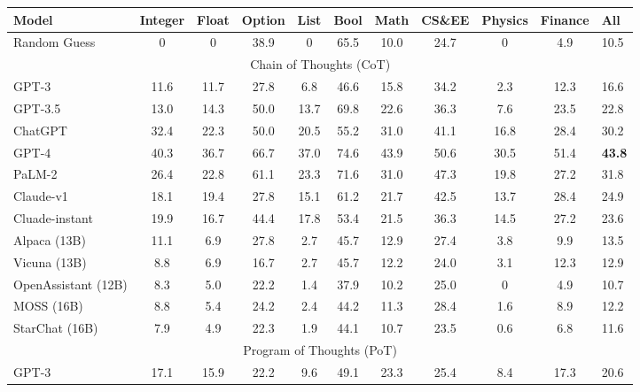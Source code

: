 \documentclass[11pt]{article}
\begin{document}
\begin{table*}[!t]
\centering
\small
\begin{tabular}{l|ccccc|cccc|l}
\toprule
Model               & Integer & Float & Option & List & Bool & Math & CS\&EE & Physics & Finance & All    \\
\midrule
Random Guess        & 0       &  0    & 38.9   & 0    & 65.5 & 10.0 & 24.7   & 0       &  4.9    & 10.5          \\
\midrule
\multicolumn{11}{c}{Chain of Thoughts (CoT)} \\
\midrule
GPT-3               & 11.6    & 11.7  & 27.8   & 6.8  & 46.6 & 15.8 & 34.2   & 2.3     &  12.3   & 16.6          \\
GPT-3.5             & 13.0    & 14.3  & 50.0   & 13.7 & 69.8 & 22.6 & 36.3   & 7.6     &  23.5   & 22.8          \\
ChatGPT             & 32.4    & 22.3  & 50.0   & 20.5 & 55.2 & 31.0 & 41.1   & 16.8    &  28.4   & 30.2          \\
GPT-4               & 40.3    & 36.7  & 66.7   & 37.0 & 74.6 & 43.9 & 50.6   & 30.5    &  51.4   & \textbf{43.8} \\
PaLM-2              & 26.4    & 22.8  & 61.1   & 23.3 & 71.6 & 31.0 & 47.3   & 19.8    &  27.2   & 31.8          \\
Claude-v1           & 18.1    & 19.4  & 27.8   & 15.1 & 61.2 & 21.7 & 42.5   & 13.7    &  28.4   & 24.9          \\
Cluade-instant      & 19.9    & 16.7  & 44.4   & 17.8 & 53.4 & 21.5 & 36.3   & 14.5    &  27.2   & 23.6          \\
\midrule
Alpaca (13B)        & 11.1    & 6.9   & 27.8   & 2.7  & 45.7 & 12.9  & 27.4   & 3.8     &  9.9    & 13.5       \\
Vicuna (13B)        & 8.8     & 6.9   & 16.7   & 2.7  & 45.7 & 12.2  & 24.0   & 3.1     &  12.3   & 12.9       \\
OpenAssistant (12B) & 8.3     & 5.0   & 22.2   & 1.4  & 37.9 & 10.2  & 25.0   & 0       &  4.9    & 10.7       \\
MOSS (16B)          & 8.8     & 5.4   & 24.2   & 2.4  & 44.2 & 11.3  & 28.4   & 1.6     &  8.9    & 12.2      \\
StarChat (16B)      & 7.9     & 4.9   & 22.3   & 1.9  & 44.1 & 10.7  & 23.5   & 0.6     &  6.8    & 11.6       \\
\midrule
\multicolumn{11}{c}{Program of Thoughts (PoT)} \\
\midrule
GPT-3        & 17.1    & 15.9  & 22.2   & 9.6  & 49.1 & 23.3 & 25.4   & 8.4     &  17.3   & 20.6          \\

\end{tabular}
\end{table*}
\end{document}

